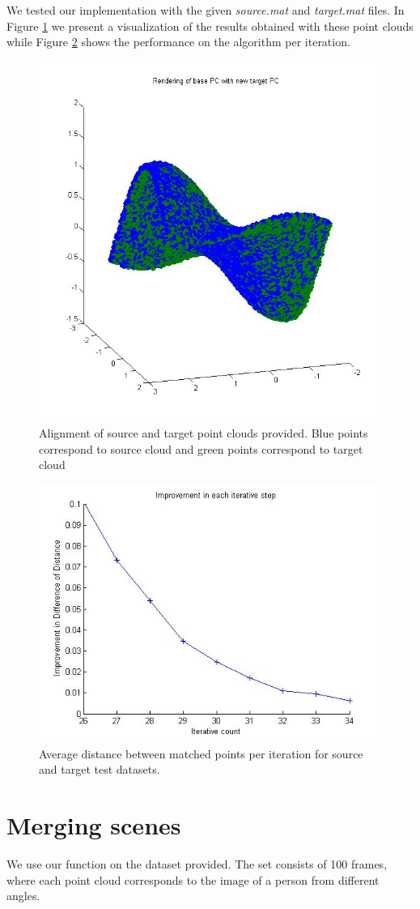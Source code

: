 \documentclass[11pt]{article}
\begin{document}
We tested our implementation with the given \textit{source.mat} and \textit{target.mat} files. In Figure \ref{fig:test} we present a visualization of the results obtained with these point clouds while Figure \ref{fig:test_performance} shows the performance on the algorithm per iteration.

\begin{figure}[H]
	\centering
	\includegraphics[width=.6\textwidth]{img/test_clouds.jpg}
	\caption{Alignment of source and target point clouds provided. Blue points correspond to source cloud and green points correspond to target cloud}
	\label{fig:test}
\end{figure}

\begin{figure}[H]
	\centering
	\includegraphics[width=.6\textwidth]{img/test_performance.jpg}
	\caption{Average distance between matched points per iteration for source and target test datasets.}
	\label{fig:test_performance}
\end{figure}


\section{Merging scenes}
We use our function on the dataset provided. The set consists of 100 frames, where each point cloud corresponds to the image of a person from different angles.
\end{document}
